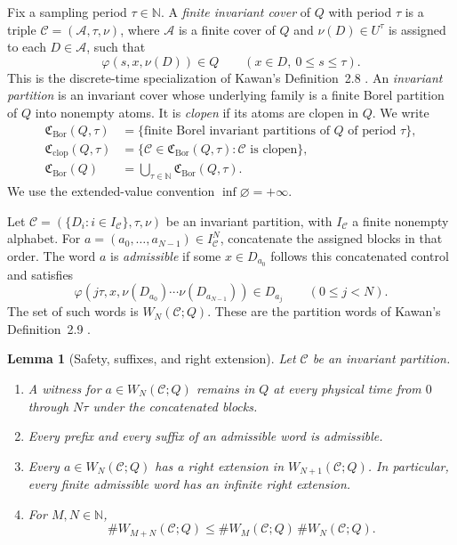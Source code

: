 \documentclass[11pt,reqno]{amsart}
\numberwithin{equation}{section}
\newtheorem{lemma}[theorem]{Lemma}
\theoremstyle{definition}
\newcommand{\N}{\mathbb N}
\newcommand{\C}{\mathcal C}
\newcommand{\Acal}{\mathcal A}
\newcommand{\Bor}{\mathrm{Bor}}
\newcommand{\clop}{\mathrm{clop}}
\begin{document}
Fix a sampling period $\tau\in\N$.  A \emph{finite invariant cover} of $Q$
with period $\tau$ is a triple $\C=(\Acal,\tau,\nu)$, where $\Acal$ is a finite
cover of $Q$ and $\nu(D)\in U^\tau$ is assigned to each $D\in\Acal$, such that
\begin{equation}\label{eq:invariant-cover}
 \varphi(s,x,\nu(D))\in Q
 \qquad(x\in D,\ 0\le s\le\tau).
\end{equation}
This is the discrete-time specialization of Kawan's Definition~2.8
\cite[p.~79]{Kawan2013}.  An \emph{invariant partition} is an invariant cover
whose underlying family is a finite Borel partition of $Q$ into nonempty
atoms.  It is \emph{clopen} if its atoms are clopen in $Q$.  We write
\begin{align*}
 \mathfrak C_{\Bor}(Q,\tau)&=\bigl\{\text{finite Borel invariant partitions of
 }Q\text{ of period }\tau\bigr\},\\
 \mathfrak C_{\clop}(Q,\tau)&=\bigl\{\C\in\mathfrak C_{\Bor}(Q,\tau):
 \C\text{ is clopen}\bigr\},\\
 \mathfrak C_{\Bor}(Q)&=\bigcup_{\tau\in\N}\mathfrak C_{\Bor}(Q,\tau).
\end{align*}
We use the extended-value convention $\inf\varnothing=+\infty$.

Let $\C=(\{D_i:i\in I_\C\},\tau,\nu)$ be an invariant partition, with
$I_\C$ a finite nonempty alphabet.  For
$a=(a_0,\ldots,a_{N-1})\in I_\C^N$, concatenate the assigned blocks in that
order.  The word $a$ is \emph{admissible} if some $x\in D_{a_0}$ follows this
concatenated control and satisfies
\begin{equation}\label{eq:admissible-word}
 \varphi(j\tau,x,\nu(D_{a_0})\cdots\nu(D_{a_{N-1}}))
 \in D_{a_j}\qquad(0\le j<N).
\end{equation}
The set of such words is $W_N(\C;Q)$.  These are the partition words of
Kawan's Definition~2.9 \cite[pp.~79--80]{Kawan2013}.

\begin{lemma}[Safety, suffixes, and right extension]\label{lem:safety}
Let $\C$ be an invariant partition.
\begin{enumerate}
\item A witness for $a\in W_N(\C;Q)$ remains in $Q$ at every physical time
from $0$ through $N\tau$ under the concatenated blocks.
\item Every prefix and every suffix of an admissible word is admissible.
\item Every $a\in W_N(\C;Q)$ has a right extension in
$W_{N+1}(\C;Q)$.  In particular, every finite admissible word has an
infinite right extension.
\item For $M,N\in\N$,
\begin{equation}\label{eq:word-submult}
 \#W_{M+N}(\C;Q)
 \le \#W_M(\C;Q)\,\#W_N(\C;Q).
\end{equation}
\end{enumerate}
\end{lemma}
\end{document}
